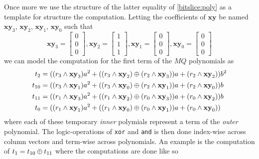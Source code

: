 Once more we use the structure of the latter equality of \cref{bitslice:poly} as a template for structure the computation. Letting the coefficients of $\textbf{xy}$ be named $\textbf{xy}_3$, $\textbf{xy}_2$, $\textbf{xy}_1$, $\textbf{xy}_0$ such that
$$
    \textbf{xy}_3 = \begin{bmatrix} 0\\ 0\\ 0 \end{bmatrix}, \textbf{xy}_2 = \begin{bmatrix} 1\\ 1\\ 1 \end{bmatrix}, \textbf{xy}_1 = \begin{bmatrix} 0\\ 0\\ 0 \end{bmatrix}, \textbf{xy}_0 = \begin{bmatrix} 0\\ 0\\ 0 \end{bmatrix}
$$
we can model the computation for the first term of the $MQ$ polynomials as
\begin{equation*}
    \begin{split}
        t_2 &= ((r_3 \wedge \textbf{xy}_3)a^2 + ((r_3 \wedge \textbf{xy}_2) \oplus (r_2 \wedge \textbf{xy}_3))a + (r_2 \wedge \textbf{xy}_2))b^2\\
        t_{10} &= ((r_3 \wedge \textbf{xy}_1)a^2 + ((r_3 \wedge \textbf{xy}_0) \oplus (r_2 \wedge \textbf{xy}_1))a + (r_2 \wedge \textbf{xy}_0))b\\
        t_{11} &= ((r_1 \wedge \textbf{xy}_3)a^2 + ((r_1 \wedge \textbf{xy}_2) \oplus (r_0 \wedge \textbf{xy}_3))a + (r_0 \wedge \textbf{xy}_2))b\\
        t_0 &= ((r_1 \wedge \textbf{xy}_1)a^2 + ((r_1 \wedge \textbf{xy}_0) \oplus (r_0 \wedge \textbf{xy}_1))a + (r_0 \wedge \textbf{xy}_0))
    \end{split}
\end{equation*}
where each of these temporary \textit{inner} polymials represent a term of the \textit{outer} polynomial. The logic-operations of \texttt{xor} and \texttt{and} is then done index-wise across column vectors and term-wise across polynomials. An example is the computation of $t_1 = t_{10} \oplus t_{11}$ where the computations are done like so
